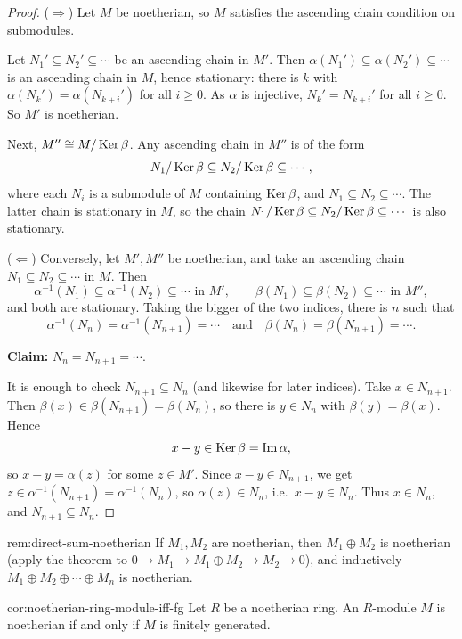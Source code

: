 \begin{proof}
($\Rightarrow$) Let $M$ be noetherian, so $M$ satisfies the ascending chain condition on submodules.

Let $N_1' \subseteq N_2' \subseteq \cdots$ be an ascending chain in $M'$. Then $\alpha(N_1') \subseteq \alpha(N_2') \subseteq \cdots$ is an ascending chain in $M$, hence stationary: there is $k$ with $\alpha(N_k') = \alpha(N_{k+i}')$ for all $i \geq 0$. As $\alpha$ is injective, $N_k' = N_{k+i}'$ for all $i \geq 0$. So $M'$ is noetherian.

Next, $M'' \cong M/\operatorname{Ker}\beta$. Any ascending chain in $M''$ is of the form
\[
N_1/\operatorname{Ker}\beta \subseteq N_2/\operatorname{Ker}\beta \subseteq \cdots,
\]
where each $N_i$ is a submodule of $M$ containing $\operatorname{Ker}\beta$, and $N_1 \subseteq N_2 \subseteq \cdots$. The latter chain is stationary in $M$, so the chain $N_1/\operatorname{Ker}\beta \subseteq N_2/\operatorname{Ker}\beta \subseteq \cdots$ is also stationary.

($\Leftarrow$) Conversely, let $M', M''$ be noetherian, and take an ascending chain $N_1 \subseteq N_2 \subseteq \cdots$ in $M$. Then
\[
\alpha^{-1}(N_1) \subseteq \alpha^{-1}(N_2) \subseteq \cdots \text{ in } M', \qquad \beta(N_1) \subseteq \beta(N_2) \subseteq \cdots \text{ in } M'',
\]
and both are stationary. Taking the bigger of the two indices, there is $n$ such that
\[
\alpha^{-1}(N_n) = \alpha^{-1}(N_{n+1}) = \cdots \quad\text{and}\quad \beta(N_n) = \beta(N_{n+1}) = \cdots.
\]

\textbf{Claim:} $N_n = N_{n+1} = \cdots$.

It is enough to check $N_{n+1} \subseteq N_n$ (and likewise for later indices). Take $x \in N_{n+1}$. Then $\beta(x) \in \beta(N_{n+1}) = \beta(N_n)$, so there is $y \in N_n$ with $\beta(y) = \beta(x)$. Hence
\[
x - y \in \operatorname{Ker}\beta = \operatorname{Im}\alpha,
\]
so $x - y = \alpha(z)$ for some $z \in M'$. Since $x - y \in N_{n+1}$, we get $z \in \alpha^{-1}(N_{n+1}) = \alpha^{-1}(N_n)$, so $\alpha(z) \in N_n$, i.e.\ $x - y \in N_n$. Thus $x \in N_n$, and $N_{n+1} \subseteq N_n$.
\end{proof}

\begin{remark}{}{rem:direct-sum-noetherian}
If $M_1, M_2$ are noetherian, then $M_1 \oplus M_2$ is noetherian (apply the theorem to $0 \to M_1 \to M_1 \oplus M_2 \to M_2 \to 0$), and inductively $M_1 \oplus M_2 \oplus \cdots \oplus M_n$ is noetherian.
\end{remark}

\begin{corollary}{}{cor:noetherian-ring-module-iff-fg}
Let $R$ be a noetherian ring. An $R$-module $M$ is noetherian if and only if $M$ is finitely generated.
\end{corollary}

